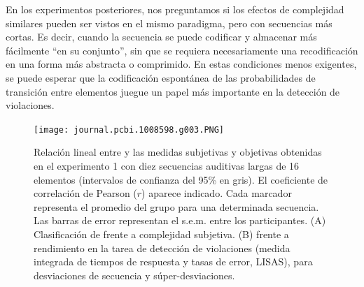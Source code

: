 En los experimentos posteriores, nos preguntamos si los efectos de complejidad similares pueden ser vistos en el mismo paradigma, pero con secuencias más cortas. Es decir, cuando la secuencia se puede codificar y almacenar más fácilmente ``en su conjunto'', sin que se requiera necesariamente una recodificación en una forma más abstracta o comprimido. En estas condiciones menos exigentes, se puede esperar que la codificación espontánea de las probabilidades de transición entre elementos juegue un papel más importante en la detección de violaciones.

\begin{figure}[t!]
   \texttt{[image: journal.pcbi.1008598.g003.PNG]}
   \centering
   \caption{Relación lineal entre \mdlbin y las medidas subjetivas y objetivas obtenidas en el experimento 1 con diez secuencias auditivas largas de 16 elementos (intervalos de confianza del 95\% en gris). El coeficiente de correlación de Pearson ($r$) aparece indicado. Cada marcador representa el promedio del grupo para una determinada secuencia. Las barras de error representan el s.e.m. entre los participantes. (A) Clasificación de \mdlbin frente a complejidad subjetiva. (B) \mdlbin frente a rendimiento en la tarea de detección de violaciones (medida integrada de tiempos de respuesta y tasas de error, LISAS), para desviaciones de secuencia y súper-desviaciones.}
   \label{PlosBIO-F3}
\end{figure}


